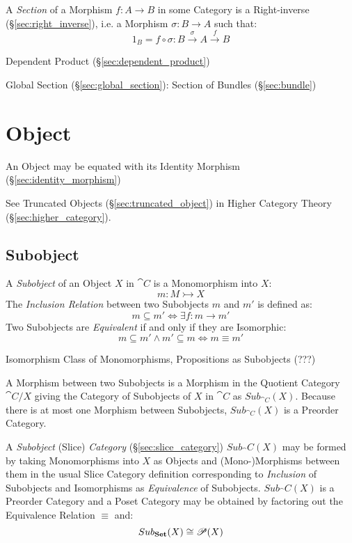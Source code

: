 A \emph{Section} of a Morphism $f : A \rightarrow B$ in some Category
is a Right-inverse (\S\ref{sec:right_inverse}), i.e. a Morphism
$\sigma : B \rightarrow A$ such that:
\[
  1_B = f \circ \sigma : B \xrightarrow{\sigma} A \xrightarrow{f} B
\]

Dependent Product (\S\ref{sec:dependent_product})

Global Section (\S\ref{sec:global_section}): Section of Bundles
(\S\ref{sec:bundle})



\section{Object}\label{sec:category_object}

An Object may be equated with its Identity Morphism
(\S\ref{sec:identity_morphism})

\fist See Truncated Objects (\S\ref{sec:truncated_object}) in Higher
Category Theory (\S\ref{sec:higher_category}).



\subsection{Subobject}\label{sec:subobject}

A \emph{Subobject} of an Object $X$ in $\cat{C}$ is a Monomorphism
into $X$:
\[
  m : M \rightarrowtail X
\]
The \emph{Inclusion Relation} between two Subobjects $m$ and $m'$ is
defined as:
\[
  m \subseteq m' \Leftrightarrow \exists f : m \rightarrow m'
\]
Two Subobjects are \emph{Equivalent} if and only if they are
Isomorphic:
\[
  m \subseteq m' \wedge m' \subseteq m \Leftrightarrow m \equiv m'
\]

Isomorphism Class of Monomorphisms, Propositions as Subobjects (???)

A Morphism between two Subobjects is a Morphism in the Quotient
Category $\cat{C}/X$ giving the Category of Subobjects of $X$ in
$\cat{C}$ as $Sub_{\cat{C}}(X)$. Because there is at most one
Morphism between Subobjects, $Sub_{\cat{C}}(X)$ is a Preorder
Category.

A \emph{Subobject} (Slice) \emph{Category}
(\S\ref{sec:slice_category}) $Sub_\cat{C}(X)$ may be formed by
taking Monomorphisms into $X$ as Objects and (Mono-)Morphisms between
them in the usual Slice Category definition corresponding to
\emph{Inclusion} of Subobjects and Isomorphisms as \emph{Equivalence}
of Subobjects. $Sub_\cat{C}(X)$ is a Preorder Category and a Poset
Category may be obtained by factoring out the Equivalence Relation
$\equiv$ and:
\[
  Sub_\mathbf{Set}(X) \cong \mathscr{P}(X)
\]

